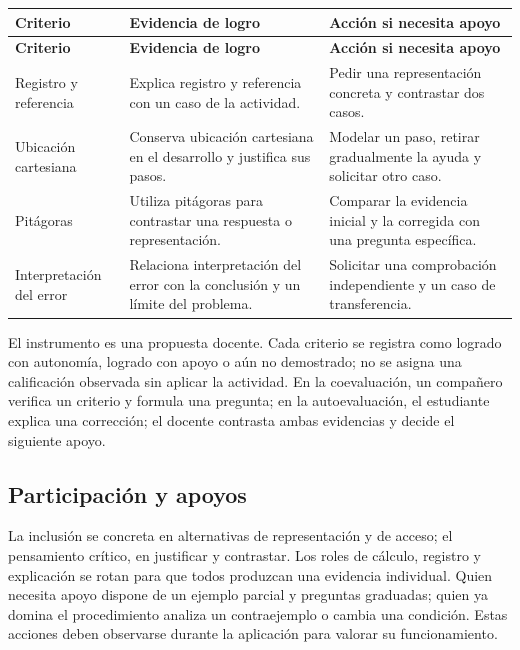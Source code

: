 \documentclass[spanish,letterpaper,oneside]{article}
\begin{document}
{\small{}\renewcommand{\arraystretch}{1.25}
\begin{longtable}{|>{\raggedright\arraybackslash}p{}|>{\raggedright\arraybackslash}p{}|>{\raggedright\arraybackslash}p{}|}\hline
\rowcolor{iiiepePale} \textbf{Criterio} & \textbf{Evidencia de logro} & \textbf{Acción si necesita apoyo} \\\hline
\endfirsthead
\hline
\rowcolor{iiiepePale} \textbf{Criterio} & \textbf{Evidencia de logro} & \textbf{Acción si necesita apoyo} \\\hline
\endhead
Registro y referencia & Explica registro y referencia con un caso de la actividad. & Pedir una representación concreta y contrastar dos casos. \\\hline
Ubicación cartesiana & Conserva ubicación cartesiana en el desarrollo y justifica sus pasos. & Modelar un paso, retirar gradualmente la ayuda y solicitar otro caso. \\\hline
Pitágoras & Utiliza pitágoras para contrastar una respuesta o representación. & Comparar la evidencia inicial y la corregida con una pregunta específica. \\\hline
Interpretación del error & Relaciona interpretación del error con la conclusión y un límite del problema. & Solicitar una comprobación independiente y un caso de transferencia. \\\hline
\end{longtable}}
El instrumento es una propuesta docente. Cada criterio se registra como logrado con autonomía, logrado con apoyo o aún no demostrado; no se asigna una calificación observada sin aplicar la actividad. En la coevaluación, un compañero verifica un criterio y formula una pregunta; en la autoevaluación, el estudiante explica una corrección; el docente contrasta ambas evidencias y decide el siguiente apoyo.\subsection{Participación y apoyos}
La inclusión se concreta en alternativas de representación y de acceso; el pensamiento crítico, en justificar y contrastar. Los roles de cálculo, registro y explicación se rotan para que todos produzcan una evidencia individual. Quien necesita apoyo dispone de un ejemplo parcial y preguntas graduadas; quien ya domina el procedimiento analiza un contraejemplo o cambia una condición. Estas acciones deben observarse durante la aplicación para valorar su funcionamiento.
\end{document}
